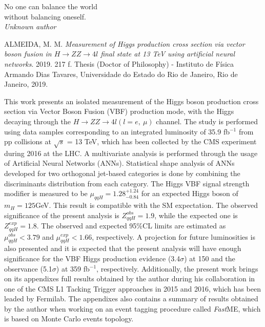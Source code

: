 \documentclass[a4paper,12pt,oneside,onecolumn,final,fleqn]{repUERJ}
\begin{document}
\pretextualchapter{}
\vfill
\begin{flushright}
No one can balance the world\\ 
without balancing oneself.\\
\textit{Unknown author}
\end{flushright}

\hspace{-1.3cm} ALMEIDA, M. M. \textit{Measurement of Higgs production cross section via vector boson fusion in $H \rightarrow ZZ \rightarrow 4l$ final state at 13 TeV using artificial neural networks}. 2019. 217 f. Thesis (Doctor of Philosophy) - Instituto de Física Armando Dias Tavares, Universidade do Estado do Rio de Janeiro, Rio de Janeiro, 2019.

\vspace{1cm}
This work presents an isolated measurement of the Higgs boson production cross section via Vector Boson Fusion (VBF) production mode, with the Higgs decaying through the $H \rightarrow ZZ \rightarrow 4l (l=e,~\mu)$ channel. The study is performed using data samples corresponding to an integrated luminosity of 35.9 fb$^{-1}$ from pp collisions at $\sqrt{s}$ = 13 TeV, which has been collected by the CMS experiment during 2016 at the LHC. A multivariate analysis is performed through the usage of Artificial Neural Networks (ANNs). Statistical shape analysis of ANNs developed for two orthogonal jet-based categories is done by combining the discriminants distribution from each category. The Higgs VBF signal strength modifier is measured to be $\mu_{qqH} = 1.28^{+1.24}_{-0.84}$ for an expected Higgs boson of $m_{H} = 125$GeV. This result is compatible with the SM expectation. The observed significance of the present analysis is $Z_{qqH}^{obs} = 1.9$, while the expected one is $Z_{qqH}^{exp} = 1.8$. The observed and expected 95$\%$CL limits are estimated as $\mu_{qqH}^{obs} < 3.79$ and $\mu_{qqH}^{exp} < 1.66$, respectively. A projection for future luminosities is also presented and it is expected that the present analysis will have enough significance for the VBF Higgs production evidence (3.4$\sigma$) at 150 and the observance (5.1$\sigma$) at 359 fb$^{-1}$, respectively. Additionally, the present work brings on its appendixes full results obtained by the author during his collaboration in one of the CMS L1 Tacking Trigger approaches in 2015 and 2016, which has been leaded by Fermilab. The appendixes also contains a summary of results obtained by the author when working on an event tagging procedure called \textit{Fast}ME, which is based on Monte Carlo events topology.
\end{document}
